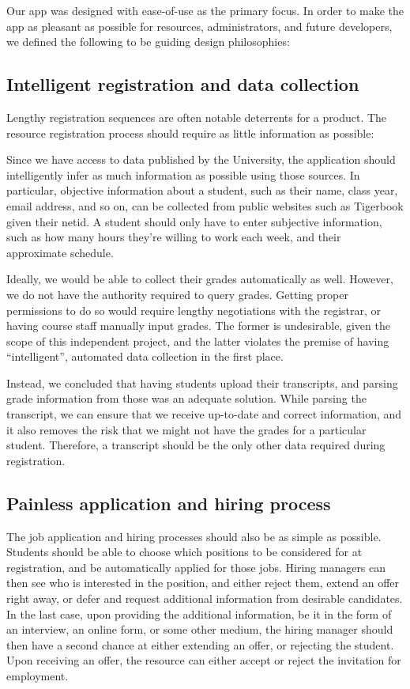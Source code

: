 
Our app was designed with ease-of-use as the primary focus. In order to make the app as pleasant as possible for resources, administrators, and future developers, we defined the following to be guiding design philosophies:

\subsection{Intelligent registration and data collection}

Lengthy registration sequences are often notable deterrents for a product. The resource registration process should require as little information as possible:

Since we have access to data published by the University, the application should intelligently infer as much information as possible using those sources. In particular, objective information about a student, such as their name, class year, email address, and so on, can be collected from public websites such as Tigerbook \cite{tigerbook} given their netid. A student should only have to enter subjective information, such as how many hours they're willing to work each week, and their approximate schedule.

Ideally, we would be able to collect their grades automatically as well. However, we do not have the authority required to query grades. Getting proper permissions to do so would require lengthy negotiations with the registrar, or having course staff manually input grades. The former is undesirable, given the scope of this independent project, and the latter violates the premise of having ``intelligent'', automated data collection in the first place.

Instead, we concluded that having students upload their transcripts, and parsing grade information from those was an adequate solution. While parsing the transcript, we can ensure that we receive up-to-date and correct information, and it also removes the risk that we might not have the grades for a particular student. Therefore, a transcript should be the only other data required during registration.

\subsection{Painless application and hiring process}

The job application and hiring processes should also be as simple as possible. Students should be able to choose which positions to be considered for at registration, and be automatically applied for those jobs. Hiring managers can then see who is interested in the position, and either reject them, extend an offer right away, or defer and request additional information from desirable candidates. In the last case, upon providing the additional information, be it in the form of an interview, an online form, or some other medium, the hiring manager should then have a second chance at either extending an offer, or rejecting the student. Upon receiving an offer, the resource can either accept or reject the invitation for employment.

